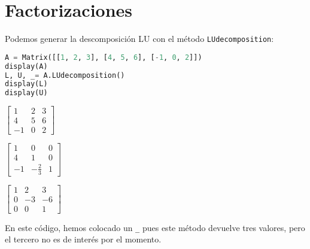 \documentclass[a4,11pt]{aleph-notas}
\begin{document}
\section{Factorizaciones}

Podemos generar la descomposición LU con el método \texttt{LUdecomposition}:
\begin{pycodigo}
    \begin{ipynbcodigo}\begin{lstlisting}[language=Python]
A = Matrix([[1, 2, 3], [4, 5, 6], [-1, 0, 2]])
display(A)
L, U, _= A.LUdecomposition()
display(L)
display(U)
    \end{lstlisting}\end{ipynbcodigo}
    \begin{ipynbsalida}[2mm]
    $\displaystyle \left[\begin{matrix}1 & 2 & 3\\4 & 5 & 6\\-1 & 0 & 2\end{matrix}\right]$

    
    $\displaystyle \left[\begin{matrix}1 & 0 & 0\\4 & 1 & 0\\-1 & - \frac{2}{3} & 1\end{matrix}\right]$

    
    $\displaystyle \left[\begin{matrix}1 & 2 & 3\\0 & -3 & -6\\0 & 0 & 1\end{matrix}\right]$
    \end{ipynbsalida}
\end{pycodigo}

En este código, hemos colocado un \texttt{\_} pues este método devuelve tres valores, pero el tercero no es de interés por el momento.
\end{document}
